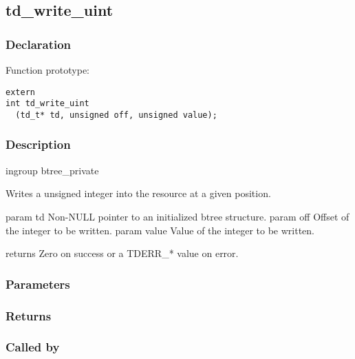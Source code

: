 
\newpage
\subsection{td\_write\_uint}
\subsubsection{Declaration} Function prototype:

\begin{verbatim}
extern
int td_write_uint
  (td_t* td, unsigned off, unsigned value);
\end{verbatim}

\subsubsection{Description}


 ingroup btree\_private

 Writes a unsigned integer into the resource at a given position.

 param td Non-NULL pointer to an initialized btree structure.
 param off Offset of the integer to be written.
 param value Value of the integer to be written.

 returns Zero on success or a TDERR\_* value on error.
 

\subsubsection{Parameters}
\subsubsection{Returns}
\subsubsection{Called by}
